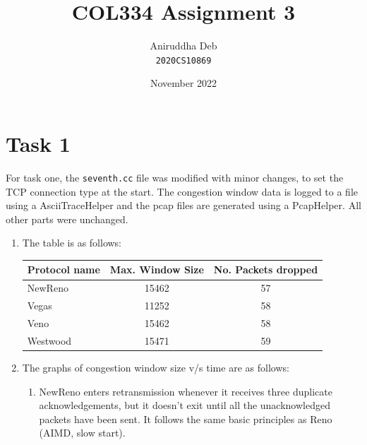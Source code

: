 \documentclass[12pt]{article}
\title{COL334 Assignment 3}
\author{Aniruddha Deb \\ \texttt{2020CS10869}}
\date{November 2022}
\begin{document}
\maketitle

\section*{Task 1}

For task one, the \texttt{seventh.cc} file was modified with minor changes, to 
set the TCP connection type at the start. The congestion window data is logged 
to a file using a AsciiTraceHelper and the pcap files are generated using a 
PcapHelper. All other parts were unchanged.

\begin{enumerate}

    \item The table is as follows:
    \begin{center}
        \begin{tabular}{|l|c|c|}
            \hline
            Protocol name & Max. Window Size & No. Packets dropped \\
            \hline
            NewReno  & 15462 & 57 \\
            Vegas    & 11252 & 58 \\
            Veno     & 15462 & 58 \\
            Westwood & 15471 & 59 \\
            \hline
        \end{tabular}
    \end{center}

    \item The graphs of congestion window size v/s time are as follows:

    \begin{enumerate}[label=(\alph*)]
        \item NewReno enters retransmission whenever it receives three duplicate acknowledgements,
        but it doesn't exit until all the unacknowledged packets have been sent. It 
        follows the same basic principles as Reno (AIMD, slow start).
        \begin{center}
        \end{center}


\end{enumerate}
\end{enumerate}
\end{document}
